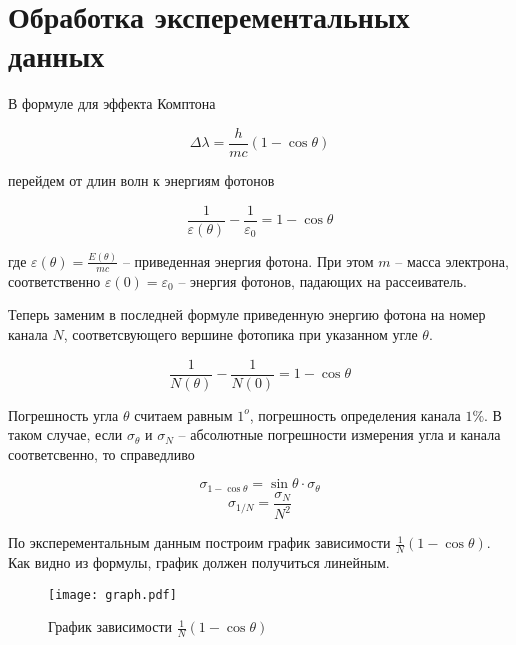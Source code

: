     \section*{Обработка эксперементальных данных}

    В формуле для эффекта Комптона 

    \begin{equation}
        \Delta \lambda = \frac{h}{mc} (1 - \cos \theta)
    \end{equation}

    перейдем от длин волн к энергиям фотонов

    \begin{equation}
        \frac{1}{\varepsilon(\theta)} - \frac{1}{\varepsilon_0} = 1 - \cos \theta
    \end{equation}

    где $\displaystyle \varepsilon(\theta) = \frac{E(\theta)}{mc}$ -- приведенная энергия фотона. 
    При этом $m$ -- масса электрона, соответственно $\varepsilon(0) = \varepsilon_0$ -- 
    энергия фотонов, падающих на рассеиватель.

    Теперь заменим в последней формуле приведенную энергию фотона на номер канала $N$, соответсвующего
    вершине фотопика при указанном угле $\theta$.

    \begin{equation}
        \frac{1}{N(\theta)} - \frac{1}{N(0)} = 1 - \cos \theta
    \end{equation}

    

    Погрешность угла $\theta$ считаем равным $1^o$, погрешность определения канала $1\%$. В таком случае,
    если $\sigma_{\theta}$ и $\sigma_N$ -- абсолютные погрешности измерения угла и канала соответсвенно,
    то справедливо
    
    \[ \sigma_{1-\cos \theta} = \sin\theta \cdot \sigma_{\theta} \]
    \[ \sigma_{1/N} = \frac{\sigma_N}{N^2} \]

    По эксперементальным данным построим график зависимости $\displaystyle \frac{1}{N}(1 - \cos \theta)$.
    Как видно из формулы, график должен получиться линейным.

    \begin{figure}
        \centering
        \texttt{[image: graph.pdf]}
        \caption{График зависимости $\frac{1}{N}(1 - \cos \theta)$}
        \label{fig:graph}
    \end{figure}

